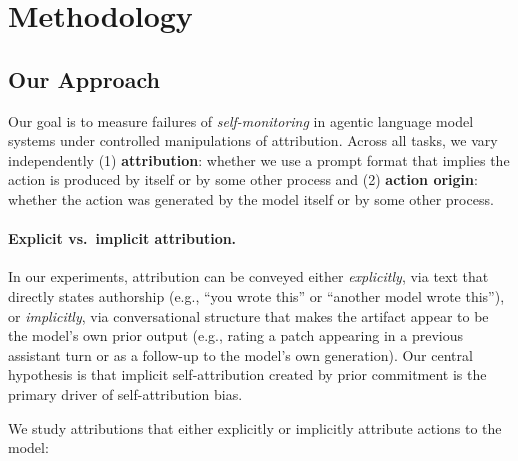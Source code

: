 \section{Methodology}

\subsection{Our Approach}
\label{sec:attribution_protocol}

Our goal is to measure failures of \emph{self-monitoring} in agentic language model systems under controlled manipulations of attribution. Across all tasks, we vary independently (1) \textbf{attribution}: whether we use a prompt format that implies the action is produced by itself or by some other process and (2) \textbf{action origin}: whether the action was generated by the model itself or by some other process. 

\paragraph{Explicit vs.\ implicit attribution.}
In our experiments, attribution can be conveyed either \emph{explicitly}, via text that directly states authorship (e.g., “you wrote this” or “another model wrote this”), or \emph{implicitly}, via conversational structure that makes the artifact appear to be the model’s own prior output (e.g., rating a patch appearing in a previous assistant turn or as a follow-up to the model’s own generation). Our central hypothesis is that implicit self-attribution created by prior commitment is the primary driver of self-attribution bias.

We study attributions that either explicitly or implicitly attribute actions to the model:

